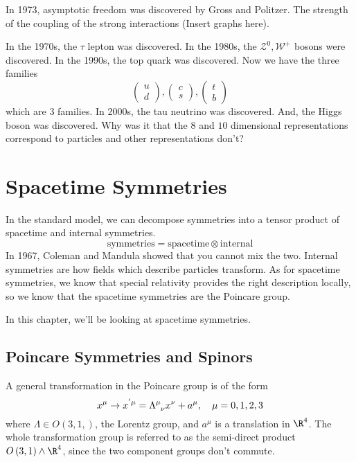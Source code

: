 \documentclass[11pt, oneside]{article}   	%
\theoremstyle{slanted}
\begin{document}
In 1973, asymptotic freedom was discovered 
by Gross and Politzer. 
The strength 
of the coupling of the strong interactions 
(Insert graphs here). 

In the 1970s, the $ \tau $ 
lepton was discovered.
In the 1980s, 
the $ \mathcal{ Z } ^ 0 , \mathcal{ W } ^ + $ 
bosons were discovered. 
In the 1990s, the top quark was discovered. 
Now we have the three families
\[
\begin{pmatrix} u \\ d  \end{pmatrix}  , 
\begin{pmatrix}  c \\ s  \end{pmatrix} , 
\begin{pmatrix}  t \\ b  \end{pmatrix} 
\] which are 3 families. 
In 2000s, the tau neutrino 
was discovered. And, 
the Higgs boson was discovered. 
Why was it that the $ 8 $ and $ 10 $ 
dimensional representations 
correspond to particles and 
other representations don't? 

\section{Spacetime Symmetries} 

In the standard model, 
we can decompose symmetries into a tensor product 
of spacetime and internal symmetries. 
\[
\text{symmetries} = \text{spacetime} \otimes \text{internal}
\] In 1967, Coleman and Mandula 
showed that you cannot mix the two. 
Internal symmetries are how fields which 
describe particles transform. 
As for spacetime symmetries, 
we know that special relativity provides the right description 
locally, so we know that the spacetime symmetries 
are the Poincare group. 

In this chapter, we'll 
be looking at spacetime symmetries. 

\subsection{Poincare Symmetries and Spinors}
A general transformation 
in the Poincare group is of the form 
\[
x ^ \mu \to x^{ ' \mu }  = \Lambda \indices{ ^ \mu _ \nu } x ^ \nu + a ^ \mu  , 
\quad \mu = 0 , 1, 2, 3 
\] where $ \Lambda \in O \left( 3, 1,  \right)  $, 
the Lorentz group, and $ a ^ \mu   $
is a translation in $ \R ^ 4$. 
The whole transformation group is 
referred to as the semi-direct product 
$ O \left( 3, 1  \right)  \wedge  \R ^ 4 $, 
since the two component groups don't
commute. 
\end{document}
